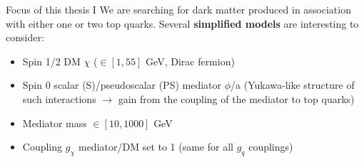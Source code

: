 \documentclass[8pt]{beamer}
\begin{document}
\begin{frame}{Focus of this thesis I}
\justifying
We are searching for \alert{dark matter produced in association with either one or two top quarks}. Several \textbf{simplified models} are interesting to consider:

\begin{itemize} 
	\justifying
	\item Spin 1/2 DM $\chi$ ($\in [1, 55]$ GeV, Dirac fermion) \\
	\item Spin 0 scalar (S)/pseudoscalar (PS) mediator $\phi$/a (Yukawa-like structure of such interactions $\rightarrow$ gain from the coupling of the mediator to top quarks) \\
	\item Mediator mass $\in [10, 1000]$ GeV \\
	\item Coupling $g_{\chi}$ mediator/DM set to 1 (same for all $g_q$ couplings) \\
\end{itemize}\vfill


\end{frame}
\end{document}
